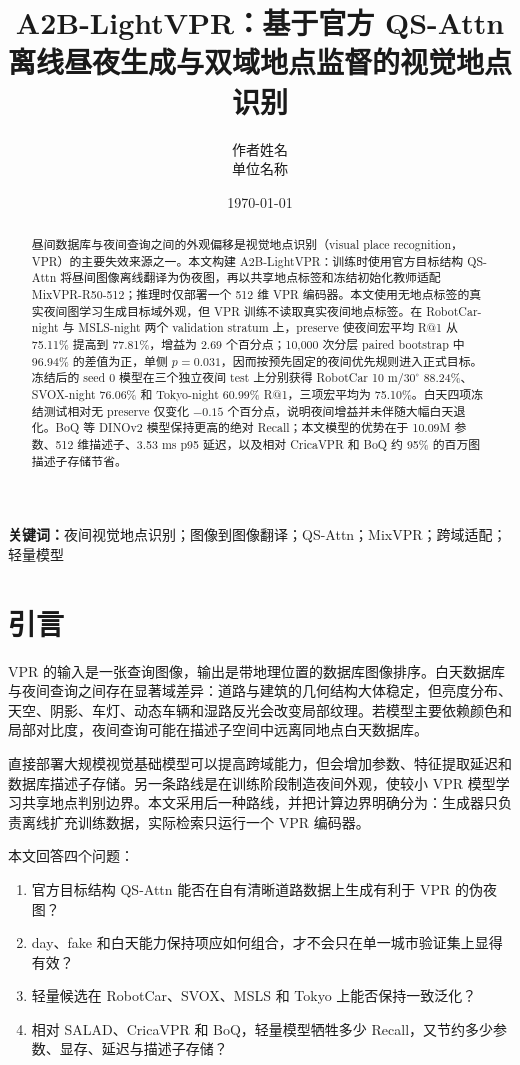 \documentclass[UTF8,a4paper,11pt]{ctexart}
\title{A2B-LightVPR：基于官方 QS-Attn 离线昼夜生成与\newline 双域地点监督的视觉地点识别}
\author{作者姓名\\单位名称}
\date{\today}
\begin{document}
\maketitle

\begin{abstract}
昼间数据库与夜间查询之间的外观偏移是视觉地点识别（visual place recognition，VPR）的主要失效来源之一。本文构建 A2B-LightVPR：训练时使用官方目标结构 QS-Attn 将昼间图像离线翻译为伪夜图，再以共享地点标签和冻结初始化教师适配 MixVPR-R50-512；推理时仅部署一个 512 维 VPR 编码器。本文使用无地点标签的真实夜间图学习生成目标域外观，但 VPR 训练不读取真实夜间地点标签。在 RobotCar-night 与 MSLS-night 两个 validation stratum 上，preserve 使夜间宏平均 R@1 从 75.11\% 提高到 77.81\%，增益为 2.69 个百分点；10,000 次分层 paired bootstrap 中 96.94\% 的差值为正，单侧 $p=0.031$，因而按预先固定的夜间优先规则进入正式目标。冻结后的 seed 0 模型在三个独立夜间 test 上分别获得 RobotCar 10 m/$30^\circ$ 88.24\%、SVOX-night 76.06\% 和 Tokyo-night 60.99\% R@1，三项宏平均为 75.10\%。白天四项冻结测试相对无 preserve 仅变化 $-0.15$ 个百分点，说明夜间增益并未伴随大幅白天退化。BoQ 等 DINOv2 模型保持更高的绝对 Recall；本文模型的优势在于 10.09M 参数、512 维描述子、3.53 ms p95 延迟，以及相对 CricaVPR 和 BoQ 约 95\% 的百万图描述子存储节省。
\end{abstract}

\noindent\textbf{关键词：}夜间视觉地点识别；图像到图像翻译；QS-Attn；MixVPR；跨域适配；轻量模型

\section{引言}
VPR 的输入是一张查询图像，输出是带地理位置的数据库图像排序。白天数据库与夜间查询之间存在显著域差异：道路与建筑的几何结构大体稳定，但亮度分布、天空、阴影、车灯、动态车辆和湿路反光会改变局部纹理。若模型主要依赖颜色和局部对比度，夜间查询可能在描述子空间中远离同地点白天数据库。

直接部署大规模视觉基础模型可以提高跨域能力，但会增加参数、特征提取延迟和数据库描述子存储。另一条路线是在训练阶段制造夜间外观，使较小 VPR 模型学习共享地点判别边界。本文采用后一种路线，并把计算边界明确分为：生成器只负责离线扩充训练数据，实际检索只运行一个 VPR 编码器。

本文回答四个问题：
\begin{enumerate}
  \item 官方目标结构 QS-Attn 能否在自有清晰道路数据上生成有利于 VPR 的伪夜图？
  \item day、fake 和白天能力保持项应如何组合，才不会只在单一城市验证集上显得有效？
  \item 轻量候选在 RobotCar、SVOX、MSLS 和 Tokyo 上能否保持一致泛化？
  \item 相对 SALAD、CricaVPR 和 BoQ，轻量模型牺牲多少 Recall，又节约多少参数、显存、延迟与描述子存储？
\end{enumerate}
\end{document}
